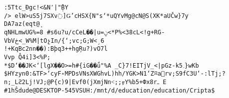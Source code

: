 \begin{alltt}
:5Ttc_Ðgc!<\&N՚|\^"̩BY\\/>~elW>uS5j7SX      v߭]Ǥ'cHSX\{N"s`*uQY  vMg@cN@S(XK*aUČw\}7y\\
DA7az(eqt@ܷ\\
          qNHLmwUG\%=8  ~\#s6u?u/cCeL��|u=ݧ<*P\%<38cL<!g+RG-VbVڂ<_W\%M|tOչIn/\{        `;vc;G;\޽W<ˏ6\\
                                                                                                     !+K qBc2ոn��):Bþq3++hgŖu?)vO7l\\
Vvp~\^Q4i]3<\%P;\\
*\$D`��JK<`[lgX��O>=h\#\{i\5G��ǘ"\%A      \ \_C\}7!ΕITjV\_<|p        Gz-k5؍\}wKb\\

\$HYzyn0:\&TF>`cyF˖MPD sVNsXWGhvL)hh/YGK>N1`Zʭarv;S9fC3U`-:lTj;?n;_LƧ2Lj!VJ;@P\{c)9|Evf0(jXmjNn˂;;ரY\%b5+Փx8rߺ~E\\
\#1hŜdude@DESKTOP-545VSUH:/mnt/d/education/education/Cripta\$\\

\end{alltt}
